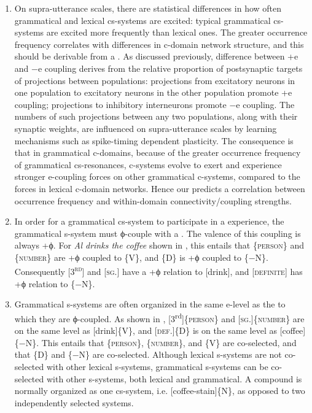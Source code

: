 \begin{enumerate}
\item On supra-utterance scales, there are statistical differences in how often grammatical and lexical cs-systems are excited: typical grammatical cs-systems are excited more frequently than lexical ones. The greater occurrence frequency correlates with differences in c-domain network structure, and this should be derivable from a . As discussed previously, difference between +e and −e coupling derives from the relative proportion of postsynaptic targets of projections between populations: projections from excitatory neurons in one population to excitatory neurons in the other population promote +e coupling; projections to inhibitory interneurons promote −e coupling. The numbers of such projections between any two populations, along with their synaptic weights, are influenced on supra-utterance scales by learning mechanisms such as spike-timing dependent plasticity. The  consequence is that in grammatical c-domains, because of the greater occurrence frequency of grammatical cs-resonances, c-systems evolve to exert and experience stronger e-coupling forces on other grammatical c-systems, compared to the forces in lexical c-domain networks. Hence our  predicts a correlation between occurrence frequency and within-domain connectivity/coupling strengths.

\item  In order for a grammatical cs-system to participate in a  experience, the grammatical s-system must ϕ-couple with a . The valence of this coupling is always +ϕ. For \textit{Al drinks the coffee} shown in {}, this entails that \{\textsc{person}\} and \{\textsc{number}\} are +ϕ coupled to \{V\}, and \{D\} is +ϕ coupled to \{−N\}. Consequently [\textsc{3}\textsc{\textsuperscript{rd}}] and [\textsc{sg}.] have a +ϕ relation to [drink], and [\textsc{definite}] has +ϕ relation to \{−N\}.

\item Grammatical s-systems are often organized in the same e-level as the  to which they are ϕ-coupled. As shown in {}, [3\textsuperscript{rd}]\{\textsc{person}\} and [\textsc{sg.}]\{\textsc{number}\} are on the same level as [drink]\{V\}, and [\textsc{def}.]\{D\} is on the same level as [coffee]\{−N\}. This entails that \{\textsc{person}\}, \{\textsc{number}\}, and \{V\} are co-selected, and that \{D\} and \{−N\} are co-selected. Although lexical s-systems are not co-selected with other lexical s-systems, grammatical s-systems can be co-selected with other s-systems, both lexical and grammatical. A compound  is normally organized as one cs-system, i.e. [coffee-stain]\{N\}, as opposed to two independently selected systems.


\end{enumerate}
